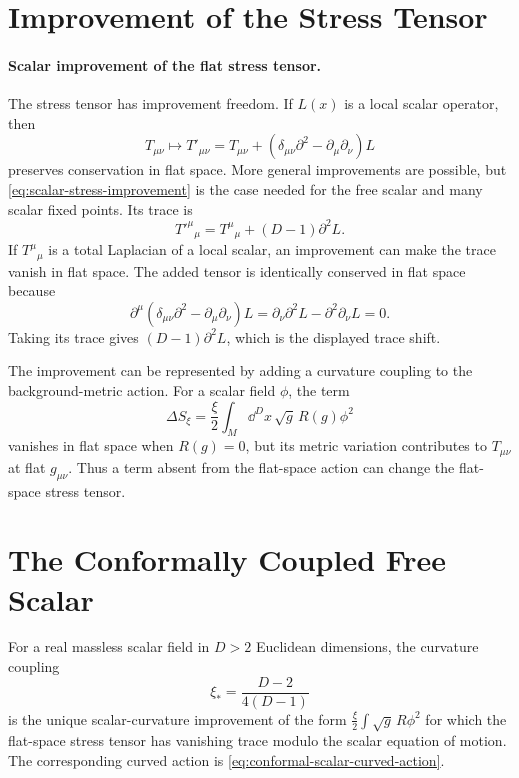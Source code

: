 \section{Improvement of the Stress Tensor}

\paragraph{Scalar improvement of the flat stress tensor.}
The stress tensor has improvement freedom.  If \(L(x)\) is a local scalar
operator, then
\begin{equation}
  T_{\mu\nu}
  \longmapsto
  T'_{\mu\nu}
  =
  T_{\mu\nu}
  +
  \left(
  \delta_{\mu\nu}\partial^2-\partial_\mu\partial_\nu
  \right)L
  \label{eq:scalar-stress-improvement}
\end{equation}
preserves conservation in flat space.  More general improvements are possible,
but \eqref{eq:scalar-stress-improvement} is the case needed for the free
scalar and many scalar fixed points.  Its trace is
\[
  T'^\mu{}_\mu
  =
  T^\mu{}_\mu
  +(D-1)\partial^2L .
\]
If \(T^\mu{}_\mu\) is a total Laplacian of a local scalar, an improvement can
make the trace vanish in flat space.
The added tensor is identically conserved in flat space because
\[
  \partial^\mu(\delta_{\mu\nu}\partial^2-\partial_\mu\partial_\nu)L
  =
  \partial_\nu\partial^2L-\partial^2\partial_\nu L
  =
  0 .
\]
Taking its trace gives
\((D-1)\partial^2L\), which is the displayed trace shift.

The improvement can be represented by adding a curvature coupling to the
background-metric action.  For a scalar field \(\phi\), the term
\[
  \Delta S_\xi
  =
  \frac{\xi}{2}
  \int_M\dd^D x\,\sqrt g\,R(g)\phi^2
\]
vanishes in flat space when \(R(g)=0\), but its metric variation contributes
to \(T_{\mu\nu}\) at flat \(g_{\mu\nu}\).  Thus a term absent from the
flat-space action can change the flat-space stress tensor.

\section{The Conformally Coupled Free Scalar}

\begin{proposition}
\label{prop:conformally-coupled-free-scalar}
For a real massless scalar field in \(D>2\) Euclidean dimensions, the curvature
coupling
\[
  \xi_\ast=\frac{D-2}{4(D-1)}
\]
is the unique scalar-curvature improvement of the form
\(\frac{\xi}{2}\int\sqrt g\,R\phi^2\) for which the flat-space stress tensor
has vanishing trace modulo the scalar equation of motion.  The corresponding
curved action is \eqref{eq:conformal-scalar-curved-action}.
\end{proposition}

